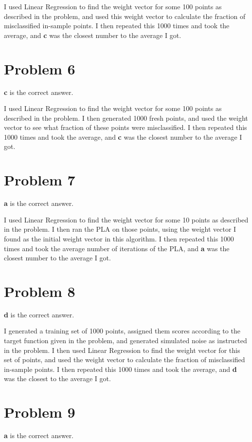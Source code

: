 \documentclass{article}
\begin{document}
\noindent I used Linear Regression to find the weight vector for some 100
points as described in the problem, and used this
weight vector to calculate the fraction of misclassified in-sample points. I
then repeated this 1000 times and took the average, and \textbf{c} was the closest
number to the average I got.
\section*{Problem 6}
\textbf{c} is the correct answer.

\noindent I used Linear Regression to find the weight vector for some 100 points
as described in the problem. I then generated 1000 fresh points, and used the
weight vector to see what fraction of these points were misclassified. I then
repeated this 1000 times and took the average, and \textbf{c} was the closest number
to the average I got.
\section*{Problem 7}
\textbf{a} is the correct answer.

\noindent I used Linear Regression to find the weight vector for some 10 points
as described in the problem. I then ran the PLA on those points, using the
weight vector I found as the initial weight vector in this algorithm.
I then repeated this 1000 times and took the average number of iterations of the
PLA, and \textbf{a} was the closest number to the average I got.
\section*{Problem 8}
\textbf{d} is the correct answer.

\noindent I generated a training set of 1000 points, assigned them scores according
to the target function given in the problem, and generated simulated noise as
instructed in the problem. I then used Linear Regression to find the weight
vector for this set of points, and used the weight vector to calculate the
fraction of misclassified in-sample points. I then repeated this 1000 times and took
the average, and \textbf{d} was the closest to the average I got.
\section*{Problem 9}
\textbf{a} is the correct answer.
\end{document}
